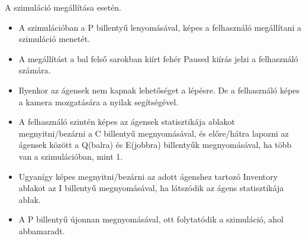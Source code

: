 A szimuláció megállítása esetén.

\begin{itemize}
    \item A szimulációban a P billentyű lenyomásával, képes a felhasználó megállítani a szimuláció menetét.
    \item A megállítást a bal felső sarokban kiírt fehér Paused kiírás jelzi a felhasználó számára.
    \item Ilyenkor az ágensek nem kapnak lehetőséget a lépésre. De a felhasználó képes a kamera mozgatására a nyilak segítségével.
    \item A felhasználó szintén képes az ágensek statisztikája ablakot megnyitni/bezárni a C billentyű megnyomásával, és előre/hátra lapozni az ágensek között a Q(balra) és E(jobbra) billentyűk megnyomásával, ha több van a szimulációban, mint 1.
    \item Ugyanígy képes megnyitni/bezárni az adott ágenshez tartozó Inventory ablakot az I billentyű megnyomásával, ha látszódik az ágens statisztikája ablak.
    \item A P billentyű újonnan megnyomásával, ott folytatódik a szimuláció, ahol abbamaradt.
\end{itemize}


\label{UI}


